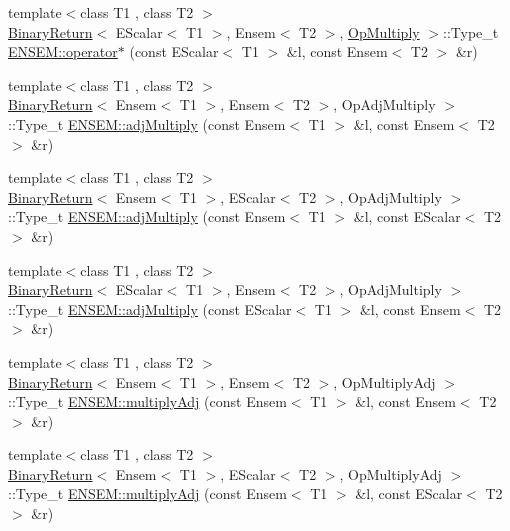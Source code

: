 \begin{DoxyCompactItemize}
\item 
{\footnotesize template$<$class T1 , class T2 $>$ }\\\mbox{\hyperlink{structBinaryReturn}{Binary\+Return}}$<$ E\+Scalar$<$ T1 $>$, Ensem$<$ T2 $>$, \mbox{\hyperlink{structOpMultiply}{Op\+Multiply}} $>$\+::Type\+\_\+t \mbox{\hyperlink{group__eensem_ga56ee052eb9134728080172ffe2e946af}{E\+N\+S\+E\+M\+::operator$\ast$}} (const E\+Scalar$<$ T1 $>$ \&l, const Ensem$<$ T2 $>$ \&r)
\item 
{\footnotesize template$<$class T1 , class T2 $>$ }\\\mbox{\hyperlink{structBinaryReturn}{Binary\+Return}}$<$ Ensem$<$ T1 $>$, Ensem$<$ T2 $>$, Op\+Adj\+Multiply $>$\+::Type\+\_\+t \mbox{\hyperlink{group__eensem_ga5f37d8984a1db92adfb04f6c0908a563}{E\+N\+S\+E\+M\+::adj\+Multiply}} (const Ensem$<$ T1 $>$ \&l, const Ensem$<$ T2 $>$ \&r)
\item 
{\footnotesize template$<$class T1 , class T2 $>$ }\\\mbox{\hyperlink{structBinaryReturn}{Binary\+Return}}$<$ Ensem$<$ T1 $>$, E\+Scalar$<$ T2 $>$, Op\+Adj\+Multiply $>$\+::Type\+\_\+t \mbox{\hyperlink{group__eensem_ga357579ea9af81c46ec906486ce9f2a52}{E\+N\+S\+E\+M\+::adj\+Multiply}} (const Ensem$<$ T1 $>$ \&l, const E\+Scalar$<$ T2 $>$ \&r)
\item 
{\footnotesize template$<$class T1 , class T2 $>$ }\\\mbox{\hyperlink{structBinaryReturn}{Binary\+Return}}$<$ E\+Scalar$<$ T1 $>$, Ensem$<$ T2 $>$, Op\+Adj\+Multiply $>$\+::Type\+\_\+t \mbox{\hyperlink{group__eensem_ga6ec27b863a98d9cf552c2a0194dc53f5}{E\+N\+S\+E\+M\+::adj\+Multiply}} (const E\+Scalar$<$ T1 $>$ \&l, const Ensem$<$ T2 $>$ \&r)
\item 
{\footnotesize template$<$class T1 , class T2 $>$ }\\\mbox{\hyperlink{structBinaryReturn}{Binary\+Return}}$<$ Ensem$<$ T1 $>$, Ensem$<$ T2 $>$, Op\+Multiply\+Adj $>$\+::Type\+\_\+t \mbox{\hyperlink{group__eensem_gae49707140467f24b7b7a50fad851d99a}{E\+N\+S\+E\+M\+::multiply\+Adj}} (const Ensem$<$ T1 $>$ \&l, const Ensem$<$ T2 $>$ \&r)
\item 
{\footnotesize template$<$class T1 , class T2 $>$ }\\\mbox{\hyperlink{structBinaryReturn}{Binary\+Return}}$<$ Ensem$<$ T1 $>$, E\+Scalar$<$ T2 $>$, Op\+Multiply\+Adj $>$\+::Type\+\_\+t \mbox{\hyperlink{group__eensem_ga8ab2ff96201bb49703846d6eb968fd11}{E\+N\+S\+E\+M\+::multiply\+Adj}} (const Ensem$<$ T1 $>$ \&l, const E\+Scalar$<$ T2 $>$ \&r)

\end{DoxyCompactItemize}
